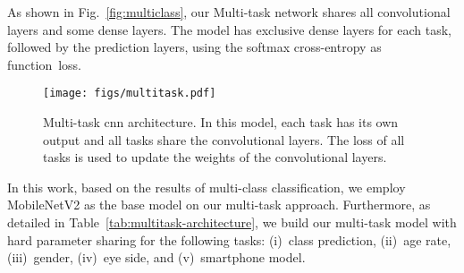 \documentclass[journal]{IEEEtran}
\begin{document}
As shown in Fig.~\ref{fig:multiclass}, our Multi-task network shares all convolutional layers and some dense layers.
The model has exclusive dense layers for each task, followed by the prediction layers, using the softmax cross-entropy as function~loss.

\begin{figure}[!ht]
\centering

   	\texttt{[image: figs/multitask.pdf]}

\caption{Multi-task \gls{cnn} architecture. In this model, each task has its own output and all tasks share the convolutional layers. The loss of all tasks is used to update the weights of the convolutional layers.}
\label{fig:multitask}
\end{figure}

In this work, based on the results of multi-class classification, we employ  MobileNetV2 as the base model on our multi-task approach.
Furthermore, as detailed in Table~\ref{tab:multitask-architecture}, we build our multi-task model with hard parameter sharing for the following  tasks: (i)~class prediction, (ii)~age rate, (iii)~gender, (iv)~eye side, and (v)~smartphone model.

\begin{table}[!htb]
\centering
\caption{Multi-task architecture in the closed-world protocol.}
\label{tab:multitask-architecture}

\vspace{-1.5mm}

 \end{table}
\end{document}
